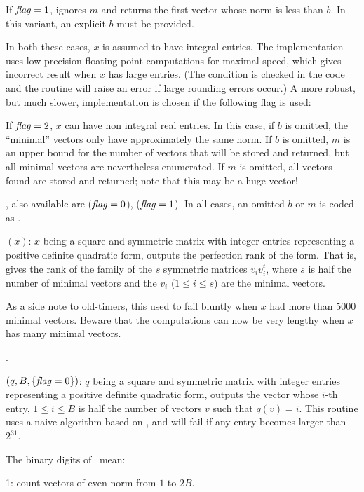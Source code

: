 If $\hbox{\it f\kern0pt lag\/}=1$, ignores $m$ and returns the first vector whose norm is less
than $b$. In this variant, an explicit $b$ must be provided.

In both these cases, $x$ is assumed to have integral entries. The
implementation uses low precision floating point computations for maximal
speed, which gives incorrect result when $x$ has large entries. (The
condition is checked in the code and the routine will raise an error if
large rounding errors occur.) A more robust, but much slower,
implementation is chosen if the following flag is used:

If $\hbox{\it f\kern0pt lag\/}=2$, $x$ can have non integral real entries. In this case, if $b$
is omitted, the ``minimal'' vectors only have approximately the same norm.
If $b$ is omitted, $m$ is an upper bound for the number of vectors that
will be stored and returned, but all minimal vectors are nevertheless
enumerated. If $m$ is omitted, all vectors found are stored and returned;
note that this may be a huge vector! 

, also available are 
($\hbox{\it f\kern0pt lag\/}=0$),  ($\hbox{\it f\kern0pt lag\/}=1$). In all cases, an omitted $b$
or $m$ is coded as .

$(x)$: $x$ being a square and symmetric matrix with
integer entries representing a positive definite quadratic form, outputs the
perfection rank of the form. That is, gives the rank of the family of the $s$
symmetric matrices $v_iv_i^t$, where $s$ is half the number of minimal
vectors and the $v_i$ ($1\le i\le s$) are the minimal vectors.

As a side note to old-timers, this used to fail bluntly when $x$ had more
than $5000$ minimal vectors. Beware that the computations can now be very
lengthy when $x$ has many minimal vectors.

.

$(q, B, \{\hbox{\it f\kern0pt lag\/} = 0\})$: $q$ being a square and symmetric
matrix with integer entries representing a positive definite quadratic form,
outputs the vector whose $i$-th entry, $1 \leq i \leq B$ is half the number
of vectors $v$ such that $q(v) = i$. This routine uses a naive algorithm
based on , and will fail if any entry becomes larger than
$2^{31}$.

\noindent The binary digits of \fl\ mean:

\item 1: count vectors of even norm from $1$ to $2B$.

